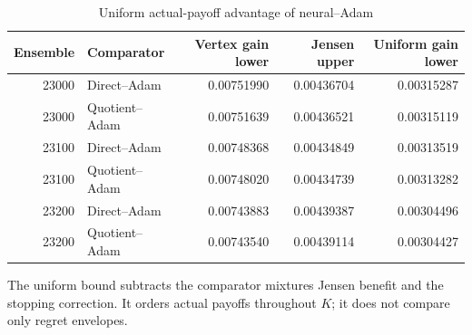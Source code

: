 \begin{table}[htbp]
\caption{Uniform actual-payoff advantage of neural--Adam}\label{tab:r23conditional}
\small\begin{tabular}{rlrrr}\toprule
Ensemble & Comparator & Vertex gain lower & Jensen upper & Uniform gain lower\\\midrule
23000 & Direct--Adam & 0.00751990 & 0.00436704 & 0.00315287\\
23000 & Quotient--Adam & 0.00751639 & 0.00436521 & 0.00315119\\
23100 & Direct--Adam & 0.00748368 & 0.00434849 & 0.00313519\\
23100 & Quotient--Adam & 0.00748020 & 0.00434739 & 0.00313282\\
23200 & Direct--Adam & 0.00743883 & 0.00439387 & 0.00304496\\
23200 & Quotient--Adam & 0.00743540 & 0.00439114 & 0.00304427\\
\bottomrule\end{tabular}
\par\smallskip\parbox{.97\textwidth}{\footnotesize The uniform bound subtracts the comparator mixture\textquotesingle s Jensen benefit and the stopping correction. It orders actual payoffs throughout $K$; it does not compare only regret envelopes.}
\end{table}
